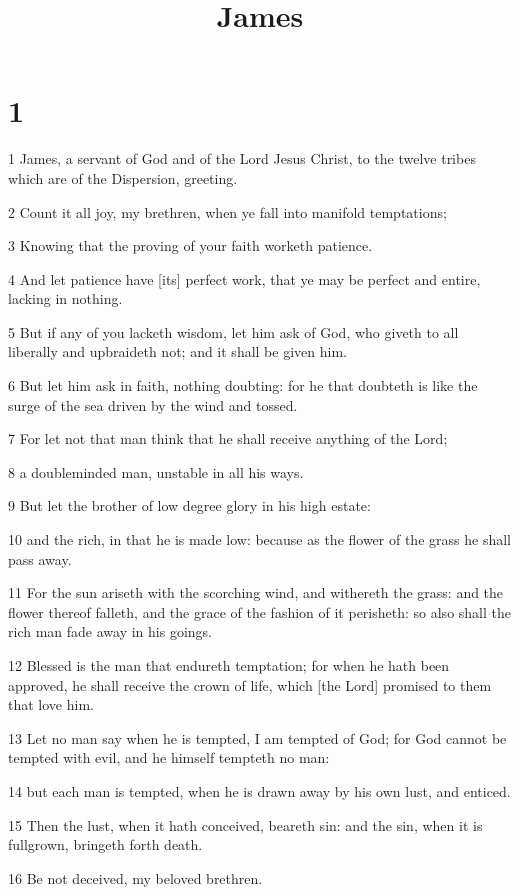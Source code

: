 

\title{James}

\chapter{1}

\par 1 James, a servant of God and of the Lord Jesus Christ, to the twelve tribes which are of the Dispersion, greeting.
\par 2 Count it all joy, my brethren, when ye fall into manifold temptations;
\par 3 Knowing that the proving of your faith worketh patience.
\par 4 And let patience have [its] perfect work, that ye may be perfect and entire, lacking in nothing.
\par 5 But if any of you lacketh wisdom, let him ask of God, who giveth to all liberally and upbraideth not; and it shall be given him.
\par 6 But let him ask in faith, nothing doubting: for he that doubteth is like the surge of the sea driven by the wind and tossed.
\par 7 For let not that man think that he shall receive anything of the Lord;
\par 8 a doubleminded man, unstable in all his ways.
\par 9 But let the brother of low degree glory in his high estate:
\par 10 and the rich, in that he is made low: because as the flower of the grass he shall pass away.
\par 11 For the sun ariseth with the scorching wind, and withereth the grass: and the flower thereof falleth, and the grace of the fashion of it perisheth: so also shall the rich man fade away in his goings.
\par 12 Blessed is the man that endureth temptation; for when he hath been approved, he shall receive the crown of life, which [the Lord] promised to them that love him.
\par 13 Let no man say when he is tempted, I am tempted of God; for God cannot be tempted with evil, and he himself tempteth no man:
\par 14 but each man is tempted, when he is drawn away by his own lust, and enticed.
\par 15 Then the lust, when it hath conceived, beareth sin: and the sin, when it is fullgrown, bringeth forth death.
\par 16 Be not deceived, my beloved brethren.
